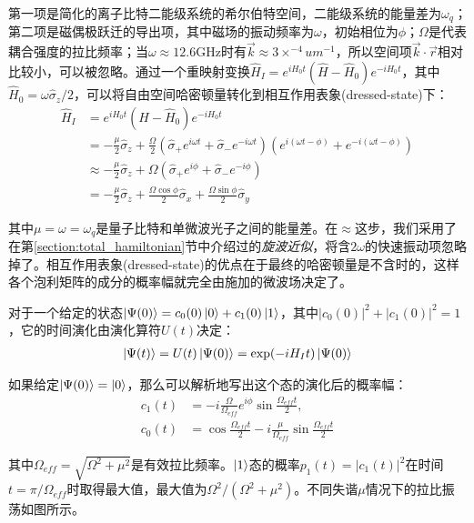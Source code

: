 第一项是简化的离子比特二能级系统的希尔伯特空间，二能级系统的能量差为$\omega_q$；第二项是磁偶极跃迁的导出项，其中磁场的振动频率为$\omega$，初始相位为$\phi$；$\Omega$是代表耦合强度的拉比频率；当$\omega\approx 12.6$GHz时有$\vec{k}\approx3\times ^{-4}um^{-1}$，所以空间项$\vec{k}\cdot \vec{r}$相对比较小，可以被忽略。通过一个重映射变换$\hat{H}_I=e^{iH_0t}(\hat{H}-\hat{H}_0)e^{-iH_0t}$，其中$\hat{H}_0=\omega\hat{\sigma}_z/2$，可以将自由空间哈密顿量转化到相互作用表象(dressed-state)下：
\begin{align}
    \hat{H}_I&=e^{iH_0t}(\hat{H}-\hat{H}_0)e^{-iH_0t}\\
    &=-\frac{\mu}{2}\hat{\sigma}_z+\frac{\Omega}{2}\left(\hat{\sigma}_+e^{i\omega t}+\hat{\sigma}_-e^{-i\omega t}\right)\left(e^{i(\omega t-\phi)}+e^{-i(\omega t-\phi)}\right)\\
    &\approx -\frac{\mu}{2}\hat{\sigma}_z+\Omega(\hat{\sigma}_+e^{i\phi}+\hat{\sigma}_-e^{-i\phi})\\
    &=-\frac{\mu}{2}\hat{\sigma}_z+\frac{\Omega\cos{\phi}}{2}\hat{\sigma}_x+\frac{\Omega\sin{\phi}}{2}\hat{\sigma}_y\label{eq:interaction_hamiltonian_microwave}
\end{align}

其中$\mu=\omega=\omega_q$是量子比特和单微波光子之间的能量差。在$\approx$这步，我们采用了在第\ref{section:total_hamiltonian}节中介绍过的\emph{旋波近似}，将含$2\omega$的快速振动项忽略掉了。相互作用表象(dressed-state)的优点在于最终的哈密顿量是不含时的，这样各个泡利矩阵的成分的概率幅就完全由施加的微波场决定了。

对于一个给定的状态$\ket{\Psi(0)}=c_0(0)\ket{0}+c_1(0)\ket{1}$，其中$|c_0(0)|^2+|c_1(0)|^2=1$，它的时间演化由演化算符$U(t)$决定：
\begin{align}
    \ket{\Psi(t)}=U(t)\ket{\Psi(0)}=\exp(-iH_It)\ket{\Psi(0)}
\end{align}

如果给定$\ket{\Psi(0)}=\ket{0}$，那么可以解析地写出这个态的演化后的概率幅：
\begin{align}
    c_1(t)&=-i\frac{\Omega}{\Omega_{eff}}e^{i\phi}\sin{\frac{\Omega_{eff}t}{2}},\\
    c_0(t)&=\cos{\frac{\Omega_{eff}t}{2}}-i\frac{\mu}{\Omega_{eff}}\sin{\frac{\Omega_{eff}t}{2}}
\end{align}

其中$\Omega_{eff}=\sqrt{\Omega^2+\mu^2}$是有效拉比频率\cite[]{Foot_2005}。$\ket{1}$态的概率$p_1(t)=|c_1(t)|^2$在时间$t=\pi/\Omega_{eff}$时取得最大值，最大值为$\Omega^2/(\Omega^2+\mu^2)$。不同失谐$\mu$情况下的拉比振荡如图所示。

